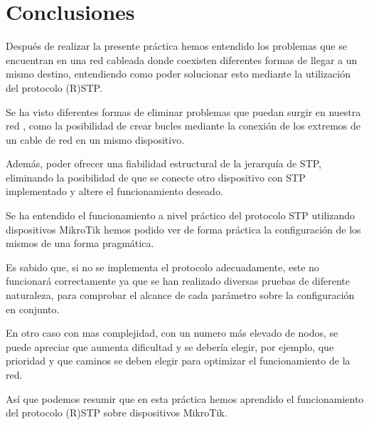 
\chapter{Conclusiones}

Después de realizar la presente práctica hemos entendido los problemas que se encuentran en una red cableada donde coexisten diferentes formas de llegar a un mismo destino, entendiendo como poder solucionar esto mediante la utilización del protocolo (R)STP.

Se ha visto diferentes formas de eliminar problemas que puedan surgir en nuestra red , como la posibilidad de crear bucles mediante la conexión de los extremos de un cable de red en un mismo dispositivo.

Además, poder ofrecer una fiabilidad estructural de la jerarquía de STP, eliminando la posibilidad de que se conecte otro dispositivo con STP implementado y altere el funcionamiento deseado.

Se ha entendido el funcionamiento a nivel práctico del protocolo STP utilizando dispositivos MikroTik  hemos podido ver de forma práctica la configuración de los mismos de una forma pragmática.

Es sabido que, si no se implementa el protocolo adecuadamente, este no funcionará correctamente ya que se han realizado diversas pruebas de diferente naturaleza, para comprobar el alcance de cada parámetro sobre la configuración en conjunto.

En otro caso con mas complejidad, con un numero más elevado de nodos, se puede apreciar que aumenta dificultad y se debería elegir, por ejemplo, que prioridad y que caminos se deben elegir para optimizar el funcionamiento de la red.

Así que podemos resumir que en esta práctica hemos aprendido el funcionamiento del protocolo (R)STP sobre dispositivos MikroTik.

